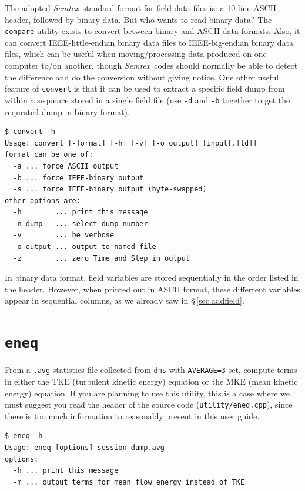 \documentclass[11pt]{report}
\newcommand{\Semtex}{\emph{Semtex}} \newcommand{\Dog}{\emph{Dog}}
\begin{document}
The adopted \Semtex\ standard format for field data files is: a
10-line ASCII header, followed by binary data.  But who wants to read
binary data?  The \verb|compare| utility exists to convert between
binary and ASCII data formats.  Also, it can convert
IEEE-little-endian binary data files to IEEE-big-endian binary data
files, which can be useful when moving/processing data produced on one
computer to/on another, though \Semtex\ codes should normally be able
to detect the difference and do the conversion without giving notice.
One other useful feature of \verb|convert| is that it can be used to
extract a specific field dump from within a sequence stored in a
single field file (use \verb|-d| and \verb|-b| together to get the
requested dump in binary format).
{\small
\begin{verbatim}
$ convert -h
Usage: convert [-format] [-h] [-v] [-o output] [input[.fld]]
format can be one of:
  -a ... force ASCII output
  -b ... force IEEE-binary output
  -s ... force IEEE-binary output (byte-swapped)
other options are:
  -h        ... print this message
  -n dump   ... select dump number
  -v        ... be verbose
  -o output ... output to named file
  -z        ... zero Time and Step in output
\end{verbatim}
}
%
In binary data format, field variables are stored sequentially in the
order listed in the header.  However, when printed out in ASCII
format, these differrent variables appear in sequential columns, as we
already saw in \S\,\ref{sec.addfield}.

\section{\texttt{eneq}}
\label{sec.eneq}

From a \verb|.avg| statistics file collected from \verb|dns| with
\verb|AVERAGE=3| set, compute terms in either the TKE (turbulent
kinetic energy) equation or the MKE (mean kinetic energy) equation.
If you are planning to use this utility, this is a case where we must
suggest you read the header of the source code
(\verb|utility/eneq.cpp|), since there is too much information to
reasonably present in this user guide.
{\small
\begin{verbatim}
$ eneq -h
Usage: eneq [options] session dump.avg
options:
  -h ... print this message
  -m ... output terms for mean flow energy instead of TKE
\end{verbatim}
}
%
\end{document}
